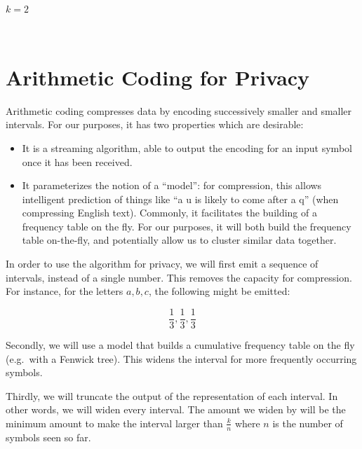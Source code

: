 \documentclass[11pt]{article}
\providecommand{\tightlist}{%
      \setlength{\itemsep}{0pt}\setlength{\parskip}{0pt}}
\begin{document}
    $k = 2$

    
    \begin{center}
    \end{center}
    { \hspace*{\fill} \\}
    
    
    
    \hypertarget{arithmetic-coding-for-privacy}{%
\section{Arithmetic Coding for
Privacy}\label{arithmetic-coding-for-privacy}}

Arithmetic coding compresses data by encoding successively smaller and
smaller intervals. For our purposes, it has two properties which are
desirable:

\begin{itemize}
\tightlist
\item
  It is a streaming algorithm, able to output the encoding for an input
  symbol once it has been received.
\item
  It parameterizes the notion of a ``model'': for compression, this
  allows intelligent prediction of things like ``a u is likely to come
  after a q'' (when compressing English text). Commonly, it facilitates
  the building of a frequency table on the fly. For our purposes, it
  will both build the frequency table on-the-fly, and potentially allow
  us to cluster similar data together.
\end{itemize}

In order to use the algorithm for privacy, we will first emit a sequence
of intervals, instead of a single number. This removes the capacity for
compression. For instance, for the letters \(a,b,c\), the following
might be emitted:

\[\frac{1}{3},\frac{1}{3},\frac{1}{3}\]

Secondly, we will use a model that builds a cumulative frequency table
on the fly (e.g.~with a Fenwick tree). This widens the interval for more
frequently occurring symbols.

Thirdly, we will truncate the output of the representation of each
interval. In other words, we will widen every interval. The amount we
widen by will be the minimum amount to make the interval larger than
\(\frac{k}{n}\) where \(n\) is the number of symbols seen so far.
\end{document}

